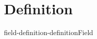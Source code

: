 \documentclass[preview]{standalone}
\begin{document}
\genpage

\section{Definition}

\begin{snippetdefinition}{field-definition-definition}{Field}
    \todo
\end{snippetdefinition}
\end{document}
